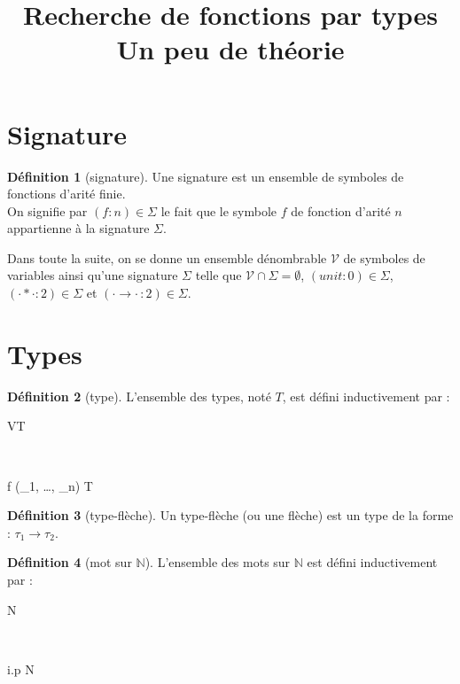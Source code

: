 \documentclass [a4paper,12pt] {article}
\title {
	Recherche de fonctions par types \\[0.5em]
	\large Un peu de théorie
}
\date {}
\theoremstyle {definition}
\newtheorem {définition} {Définition} [section]
\newcommand {\interval} [2] {[\![#1\,;#2]\!]}
\newcommand {\V} {\mathscr V}
\begin{document}
\maketitle


\section {Signature}

\begin {définition} [signature]
	Une signature est un ensemble de symboles de fonctions d'arité finie. \\
	On signifie par $(f : n) \in \Sigma$ le fait que le symbole $f$ de fonction d'arité $n$ appartienne à la signature $\Sigma$.
\end {définition}

Dans toute la suite, on se donne un ensemble dénombrable $\V$ de symboles de variables ainsi qu'une signature $\Sigma$ telle que $\V \cap \Sigma = \emptyset$, $(unit : 0) \in \Sigma$, $(\cdot * \cdot : 2) \in \Sigma$ et $(\cdot \rightarrow \cdot \, : 2) \in \Sigma$.


\section {Types}

\begin {définition} [type]
	L'ensemble des types, noté $T$, est défini inductivement par :
	\begin {center}
		\begin {prooftree}
			 {\V \subseteq T}
		\end {prooftree}
		~~~
		\begin {prooftree}
			\Hypo {(f : n) \in  \Sigma}
			\Hypo {\forall i \in \interval 1 n,\ \tau_i \in T}
			 {f (\tau_1, \dots, \tau_n) \in T}
		\end {prooftree}
	\end {center}
\end {définition}

\begin {définition} [type-flèche]
	Un type-flèche (ou une flèche) est un type de la forme : $\tau_1 \rightarrow \tau_2$.
\end {définition}

\begin {définition} [mot sur $\mathbb N$]
	L'ensemble des mots sur $\mathbb N$ est défini inductivement par :
	\begin {center}
		\begin {prooftree}
			 {\Lambda {} \mathbb N}
		\end {prooftree}
		~~~
		\begin {prooftree}
			\Hypo {i \in \mathbb N}
			\Hypo {p \text{ mot sur } \mathbb N}
			 {i.p  \mathbb N}
		\end {prooftree}
	\end {center}
\end {définition}
\end{document}
